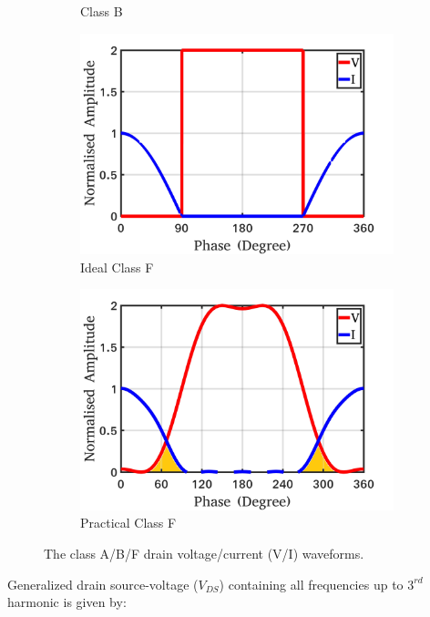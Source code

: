 \documentclass[conference]{IEEEtran}
\begin{document}
\begin{figure}[!t]
\begin{subfigure}{0.24\textwidth}
\caption{Class B}
\label{fig:CB_wave_VI}
\end{subfigure}
\begin{subfigure}{0.24\textwidth}
\includegraphics[width=1\textwidth]{Images/Intro/ClassF.jpg}
\caption{Ideal Class F}
\label{fig:ICF_wave_VI}
\end{subfigure}
\begin{subfigure}{0.24\textwidth}
\includegraphics[width=1\textwidth]{Images/Intro/CF_wave_VI_shaded.jpg}
\caption{Practical Class F}
\label{fig:CF_wave_VI}
\end{subfigure}
\caption{The class A/B/F drain  voltage/current (V/I) waveforms. \color{black}}
\label{fig:wave_VI}
\vspace{-0.25in}
\end{figure}
Generalized drain source-voltage ($V_{DS}$) containing all frequencies up to $3^{rd}$ harmonic \cite{Gen_Vds_eqn} is given by:
\end{document}
